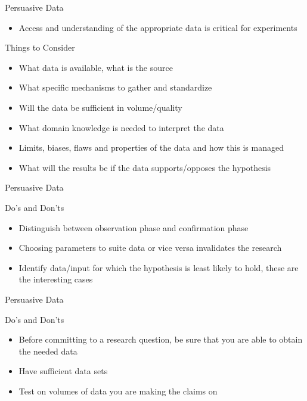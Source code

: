 \documentclass{beamer}
\begin{document}
\begin{frame}{Persuasive Data}
\begin{itemize}
\item Access and understanding of the appropriate data is critical for experiments
\end{itemize}
\begin{block}{Things to Consider}
\begin{itemize}
\item What data is available, what is the source
\item What specific mechanisms to gather and standardize
\item Will the data be sufficient in volume/quality
\item What domain knowledge is needed to interpret the data
\item Limits, biases, flaws and properties of the data and how this is managed
\item What will the results be if the data supports/opposes the hypothesis 
\end{itemize}
\end{block}
\end{frame}



\begin{frame}{Persuasive Data}
\begin{block}{Do's and Don'ts}

\begin{itemize}
\item Distinguish between observation phase and confirmation phase
\item Choosing parameters to suite data or vice versa invalidates the research
\item Identify data/input for which the hypothesis is least likely to hold, these are the interesting cases
\end{itemize}

\end{block}
\end{frame}

\begin{frame}{Persuasive Data}
\begin{block}{Do's and Don'ts}

\begin{itemize}
\item Before committing to a research question, be sure that you are able to obtain the needed data
\item Have sufficient data sets
\item Test on volumes of data you are making the claims on
\end{itemize}

\end{block}
\end{frame}
\end{document}
